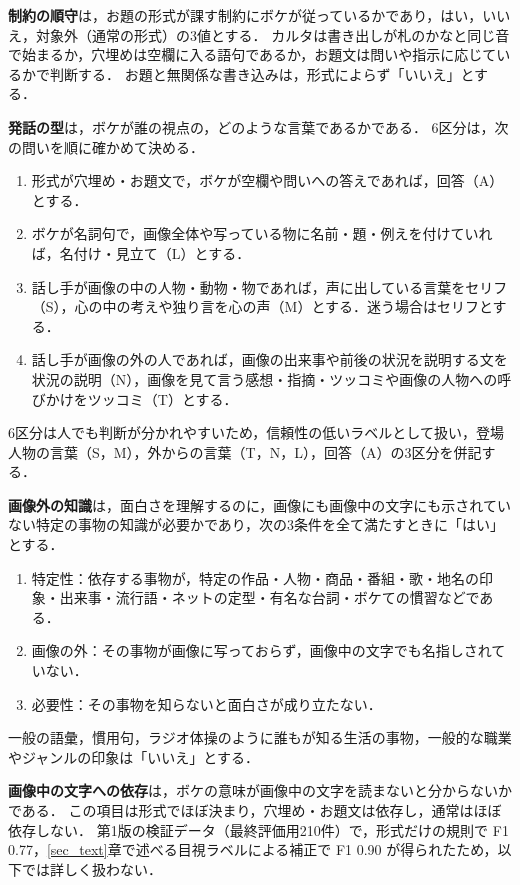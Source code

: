 \textbf{制約の順守}は，お題の形式が課す制約にボケが従っているかであり，はい，いいえ，対象外（通常の形式）の3値とする．
カルタは書き出しが札のかなと同じ音で始まるか，穴埋めは空欄に入る語句であるか，お題文は問いや指示に応じているかで判断する．
お題と無関係な書き込みは，形式によらず「いいえ」とする．

\textbf{発話の型}は，ボケが誰の視点の，どのような言葉であるかである．
6区分は，次の問いを順に確かめて決める．
\begin{enumerate}
    \item 形式が穴埋め・お題文で，ボケが空欄や問いへの答えであれば，回答（A）とする．
    \item ボケが名詞句で，画像全体や写っている物に名前・題・例えを付けていれば，名付け・見立て（L）とする．
    \item 話し手が画像の中の人物・動物・物であれば，声に出している言葉をセリフ（S），心の中の考えや独り言を心の声（M）とする．迷う場合はセリフとする．
    \item 話し手が画像の外の人であれば，画像の出来事や前後の状況を説明する文を状況の説明（N），画像を見て言う感想・指摘・ツッコミや画像の人物への呼びかけをツッコミ（T）とする．
\end{enumerate}
6区分は人でも判断が分かれやすいため，信頼性の低いラベルとして扱い，登場人物の言葉（S，M），外からの言葉（T，N，L），回答（A）の3区分を併記する．

\textbf{画像外の知識}は，面白さを理解するのに，画像にも画像中の文字にも示されていない特定の事物の知識が必要かであり，次の3条件を全て満たすときに「はい」とする．
\begin{enumerate}
    \item 特定性：依存する事物が，特定の作品・人物・商品・番組・歌・地名の印象・出来事・流行語・ネットの定型・有名な台詞・ボケての慣習などである．
    \item 画像の外：その事物が画像に写っておらず，画像中の文字でも名指しされていない．
    \item 必要性：その事物を知らないと面白さが成り立たない．
\end{enumerate}
一般の語彙，慣用句，ラジオ体操のように誰もが知る生活の事物，一般的な職業やジャンルの印象は「いいえ」とする．

\textbf{画像中の文字への依存}は，ボケの意味が画像中の文字を読まないと分からないかである．
この項目は形式でほぼ決まり，穴埋め・お題文は依存し，通常はほぼ依存しない．
第1版の検証データ（最終評価用210件）で，形式だけの規則で F1 0.77，\ref{sec_text}章で述べる目視ラベルによる補正で F1 0.90 が得られたため，以下では詳しく扱わない．
